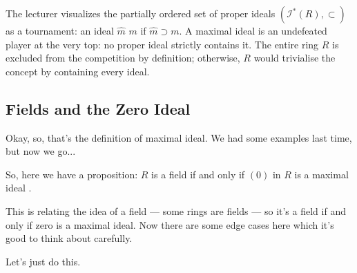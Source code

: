 \begin{insight}
The lecturer visualizes the partially ordered set of proper ideals $(\mathscr{I}^*(R), \subset)$ as a tournament: an ideal $\hat{m}$  $m$ if $\hat{m} \supset m$. A maximal ideal is an undefeated player at the very top: no proper ideal strictly contains it. The entire ring $R$ is excluded from the competition by definition; otherwise, $R$ would trivialise the concept by containing every ideal.
\end{insight}

\subsection{Fields and the Zero Ideal}

\begin{speech}[00:12:36 - 00:13:28]
Okay, so, that's the definition of maximal ideal. We had some examples last time, but now we go...

So, here we have a proposition: $R$ is a field if and only if $(0)$ in $R$ is a maximal ideal .

This is relating the idea of a field --- some rings are fields --- so it's a field if and only if zero is a maximal ideal. Now there are some edge cases here which it's good to think about carefully.

Let's just do this.
\end{speech}

\begin{content}
\end{content}

\begin{content}
\end{content}

